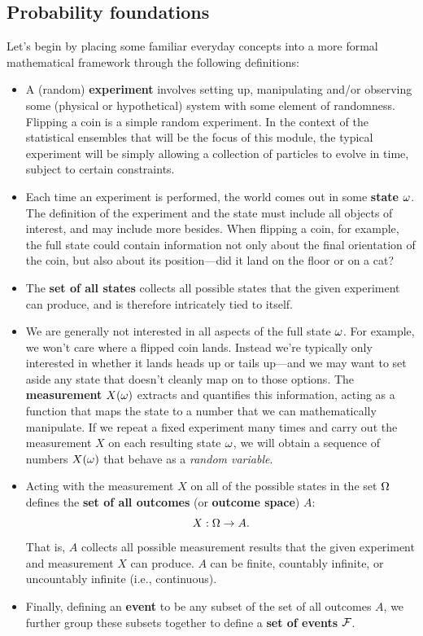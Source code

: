 \subsection{\label{sec:prob}Probability foundations}
Let's begin by placing some familiar everyday concepts into a more formal mathematical framework through the following definitions: \\[-24 pt]
\begin{itemize}
  \item A (random) \textbf{experiment} \cE involves setting up, manipulating and/or observing some (physical or hypothetical) system with some element of randomness.
        Flipping a coin is a simple random experiment.
        In the context of the statistical ensembles that will be the focus of this module, the typical experiment will be simply allowing a collection of particles to evolve in time, subject to certain constraints.
  \item Each time an experiment is performed, the world comes out in some \textbf{state} $\omega$.
        The definition of the experiment and the state must include all objects of interest, and may include more besides.
        When flipping a coin, for example, the full state could contain information not only about the final orientation of the coin, but also about its position---did it land on the floor or on a cat?
  \item The \textbf{set of all states} \Om collects all possible states \om that the given experiment \cE can produce, and is therefore intricately tied to \cE itself.
  \item We are generally not interested in all aspects of the full state $\omega$.
        For example, we won't care where a flipped coin lands.
        Instead we're typically only interested in whether it lands heads up or tails up---and we may want to set aside any state that doesn't cleanly map on to those options.
        The \textbf{measurement} $X(\omega)$ extracts and quantifies this information, acting as a function that maps the state \om to a number that we can mathematically manipulate.
        If we repeat a fixed experiment \cE many times and carry out the measurement $X$ on each resulting state $\omega$, we will obtain a sequence of numbers $X(\omega)$ that behave as a \textit{random variable}.
  \item Acting with the measurement $X$ on all of the possible states in the set $\Omega$ defines the \textbf{set of all outcomes} (or \textbf{outcome space}) $A$:
        \begin{equation*}
          X: \Omega \to A.
        \end{equation*}
        That is, $A$ collects all possible measurement results that the given experiment \cE and measurement $X$ can produce.
        $A$ can be finite, countably infinite, or uncountably infinite (i.e., continuous).
  \item Finally, defining an \textbf{event} to be any subset of the set of all outcomes $A$, we further group these subsets together to define a \textbf{set of events} $\mathcal F$.
\end{itemize}

